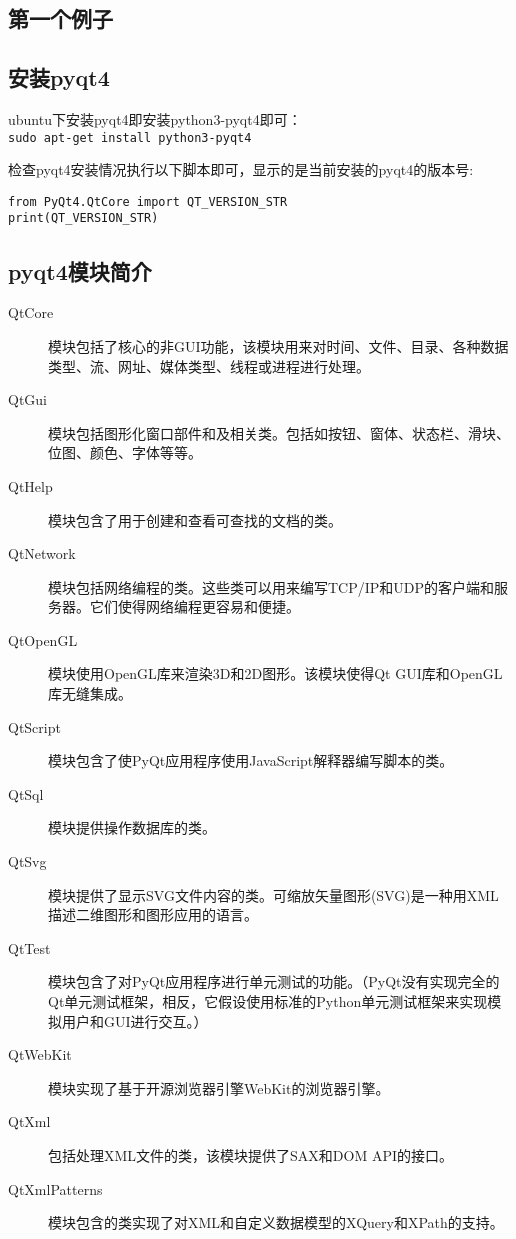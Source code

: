 \documentclass[12pt,oneside]{book}
\begin{document}
\begin{common-format}
\chapter{第一个例子}

\section{安装pyqt4}
ubuntu下安装pyqt4即安装python3-pyqt4即可：\\
\verb+sudo apt-get install python3-pyqt4+

检查pyqt4安装情况执行以下脚本即可，显示的是当前安装的pyqt4的版本号:
\begin{Verbatim}
from PyQt4.QtCore import QT_VERSION_STR
print(QT_VERSION_STR)
\end{Verbatim}

\section{pyqt4模块简介}
\begin{description}
\item[QtCore] 模块包括了核心的非GUI功能，该模块用来对时间、文件、目录、各种数据类型、流、网址、媒体类型、线程或进程进行处理。
\item[QtGui] 模块包括图形化窗口部件和及相关类。包括如按钮、窗体、状态栏、滑块、位图、颜色、字体等等。
\item[QtHelp] 模块包含了用于创建和查看可查找的文档的类。
\item[QtNetwork] 模块包括网络编程的类。这些类可以用来编写TCP/IP和UDP的客户端和服务器。它们使得网络编程更容易和便捷。
\item[QtOpenGL] 模块使用OpenGL库来渲染3D和2D图形。该模块使得Qt GUI库和OpenGL库无缝集成。
\item[QtScript] 模块包含了使PyQt应用程序使用JavaScript解释器编写脚本的类。
\item[QtSql] 模块提供操作数据库的类。
\item[QtSvg] 模块提供了显示SVG文件内容的类。可缩放矢量图形(SVG)是一种用XML描述二维图形和图形应用的语言。
\item[QtTest] 模块包含了对PyQt应用程序进行单元测试的功能。（PyQt没有实现完全的Qt单元测试框架，相反，它假设使用标准的Python单元测试框架来实现模拟用户和GUI进行交互。）
\item[QtWebKit] 模块实现了基于开源浏览器引擎WebKit的浏览器引擎。
\item[QtXml] 包括处理XML文件的类，该模块提供了SAX和DOM API的接口。
\item[QtXmlPatterns] 模块包含的类实现了对XML和自定义数据模型的XQuery和XPath的支持。

\end{description}
\end{common-format}
\end{document}
